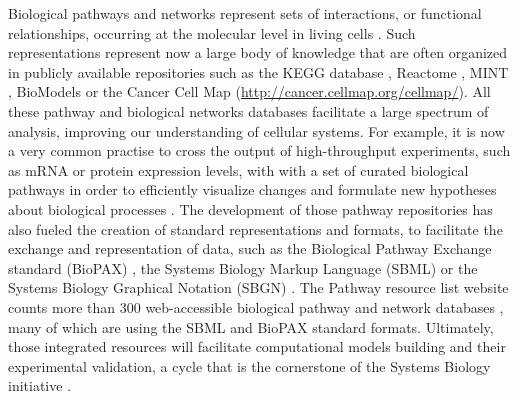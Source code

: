 \documentclass[10pt]{bmc_article}
\newenvironment{bmcformat}{\baselineskip20pt\sloppy\setboolean{publ}{false}}{\baselineskip20pt\sloppy}
\begin{document}
\begin{bmcformat}
Biological pathways and networks represent sets of interactions, or functional
relationships, occurring at the molecular level in living cells
\cite{adriaens2008public, cary2005pathway}. Such representations represent now
a large body of knowledge that are often organized in publicly available
repositories such as the KEGG database \cite{ogata1999kegg}, Reactome
\cite{joshi2005reactome}, MINT \cite{zanzoni2002mint}, BioModels
\cite{le2006biomodels} or the Cancer Cell Map
(\url{http://cancer.cellmap.org/cellmap/}). All these pathway and biological
networks databases facilitate a large spectrum of analysis, improving our
understanding of cellular systems. For example, it is now a very common
practise to cross the output of high-throughput experiments, such as mRNA or
protein expression levels, with with a set of curated biological pathways in
order to efficiently visualize changes and formulate new hypotheses about
biological processes \cite{saraiya2005visualizing,
gehlenborg2010visualization}. The development of those pathway repositories has
also fueled the creation of standard representations and formats, to facilitate
the exchange and representation of data, such as the Biological Pathway
Exchange standard (BioPAX) \cite{demir2010biopax}, the Systems Biology Markup
Language (SBML) \cite{hucka2003systems} or the Systems Biology Graphical
Notation (SBGN) \cite{le2009systems}. The Pathway resource list website counts
more than 300 web-accessible biological pathway and network databases
\cite{bader2006pathguide}, many of which are using the SBML and BioPAX standard
formats. Ultimately, those integrated resources will facilitate computational
models building and their experimental validation, a cycle that is the
cornerstone of the Systems Biology initiative \cite{karlebach2008modelling,
kitano2002systems, ideker2001new}.


\end{bmcformat}
\end{document}
